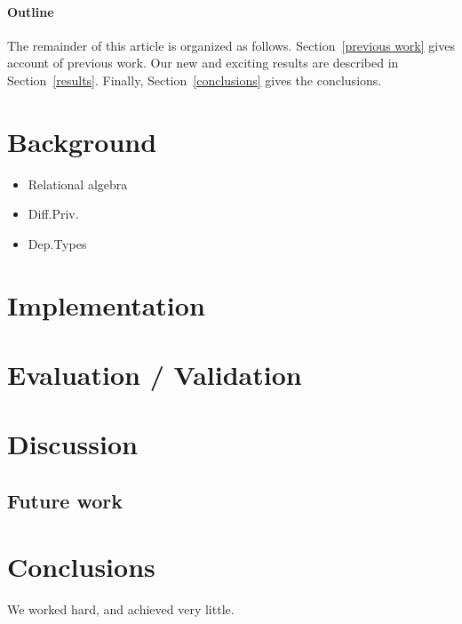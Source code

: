 \documentclass[12pt]{article}
\begin{document}
\paragraph{Outline}
The remainder of this article is organized as follows.
Section~\ref{previous work} gives account of previous work.
Our new and exciting results are described in Section~\ref{results}.
Finally, Section~\ref{conclusions} gives the conclusions.

\section{Background}\label{sec:background}

\begin{itemize}
  \item Relational algebra
  \item Diff.Priv.
  \item Dep.Types
\end{itemize}

\section{Implementation}\label{sec:implementation}

\section{Evaluation / Validation}\label{sec:evaluation}

\section{Discussion}\label{sec:discussion}

\subsection{Future work}

\section{Conclusions}\label{sec:conclusions}
We worked hard, and achieved very little.



\end{document}
